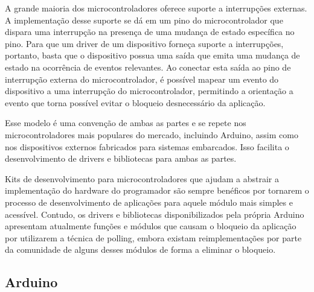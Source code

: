 \documentclass{article}
\begin{document}
\par A grande maioria dos microcontroladores oferece suporte a interrupções externas. A implementação desse suporte se dá em um pino do microcontrolador que dispara uma interrupção na presença de uma mudança de estado específica no pino. Para que um driver de um dispositivo forneça suporte a interrupções, portanto, basta que o dispositivo possua uma saída que emita uma mudança de estado na ocorrência de eventos relevantes. Ao conectar esta saída ao pino de interrupção externa do microcontrolador, é possível mapear um evento do dispositivo a uma interrupção do microcontrolador, permitindo a orientação a evento que torna possível evitar o bloqueio desnecessário da aplicação.
\par Esse modelo é uma convenção de ambas as partes e se repete nos microcontroladores mais populares do mercado, incluindo Arduino, assim como nos dispositivos externos fabricados para sistemas embarcados. Isso facilita o desenvolvimento de drivers e bibliotecas para ambas as partes.
\par Kits de desenvolvimento para microcontroladores que ajudam a abstrair a implementação do hardware do programador são sempre benéficos por tornarem o processo de desenvolvimento de aplicações para aquele módulo mais simples e acessível. Contudo, os drivers e bibliotecas disponibilizados pela própria Arduino apresentam atualmente funções e módulos que causam o bloqueio da aplicação por utilizarem a técnica de polling, embora existam reimplementações por parte da comunidade de alguns desses módulos de forma a eliminar o bloqueio.

\subsection{Arduino}
\end{document}
